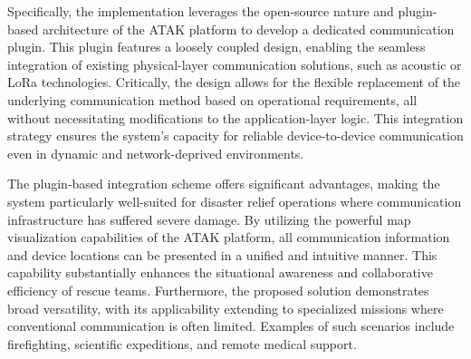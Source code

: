 Specifically, the implementation leverages the open-source nature and plugin-based architecture of the ATAK platform to develop a dedicated communication plugin. This plugin features a loosely coupled design, enabling the seamless integration of existing physical-layer communication solutions, such as acoustic or LoRa technologies. Critically, the design allows for the flexible replacement of the underlying communication method based on operational requirements, all without necessitating modifications to the application-layer logic. This integration strategy ensures the system's capacity for reliable device-to-device communication even in dynamic and network-deprived environments.

The plugin-based integration scheme offers significant advantages, making the system particularly well-suited for disaster relief operations where communication infrastructure has suffered severe damage. By utilizing the powerful map visualization capabilities of the ATAK platform, all communication information and device locations can be presented in a unified and intuitive manner. This capability substantially enhances the situational awareness and collaborative efficiency of rescue teams. Furthermore, the proposed solution demonstrates broad versatility, with its applicability extending to specialized missions where conventional communication is often limited. Examples of such scenarios include firefighting, scientific expeditions, and remote medical support. 